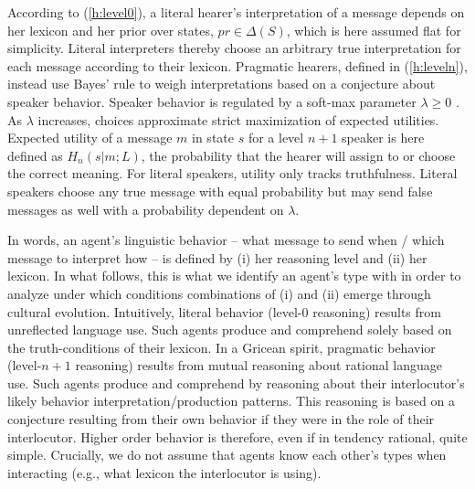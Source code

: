 \documentclass[a4paper, 11pt]{article}
\theoremstyle{Satz}
\newcommand{\state}{\ensuremath{s}\xspace}		%
\newcommand{\messg}{\ensuremath{m}\xspace}		%
\begin{document}
According to (\ref{h:level0}), a literal hearer's interpretation of a message depends on her
lexicon and her prior over states, $pr \in \Delta(S)$, which is here assumed flat for
simplicity. Literal interpreters thereby choose an arbitrary true interpretation for each
message according to their lexicon. Pragmatic hearers, defined in (\ref{h:leveln}), instead use Bayes' rule to weigh
interpretations based on a conjecture about speaker behavior. Speaker behavior is regulated by
a soft-max parameter $\lambda \geq 0$ \citep{luce:1959,sutton+barto:1998}. As
$\lambda$ increases, choices approximate strict maximization of expected utilities. Expected
utility of a message $\messg$ in state $\state$ for a level $n+1$ speaker is here defined as
$H_{n}(s|m;L)$, the probability that the hearer will assign to or choose the correct
meaning. For literal speakers, utility only tracks truthfulness. Literal speakers choose any
true message with equal probability but may send false messages as well with a probability
dependent on $\lambda$.

In words, an agent's linguistic behavior -- what message to send when / which message to interpret how -- is defined by (i) her reasoning level and (ii) her lexicon. In what follows, this is what we identify an agent's type with in order to analyze under which conditions combinations of (i) and (ii) emerge through cultural evolution. Intuitively, literal behavior (level-$0$ reasoning) results from unreflected language use. Such agents produce and comprehend solely based on the truth-conditions of their lexicon. In a Gricean spirit, pragmatic behavior (level-$n+1$ reasoning) results from mutual reasoning about rational language use. Such agents produce and comprehend by reasoning about their interlocutor's likely behavior interpretation/production patterns. This reasoning is based on a conjecture resulting from their own behavior if they were in the role of their interlocutor. Higher order behavior is therefore, even if in tendency rational, quite simple. Crucially, we do not assume that agents know each other's types when interacting (e.g., what lexicon the interlocutor is using).
\end{document}
